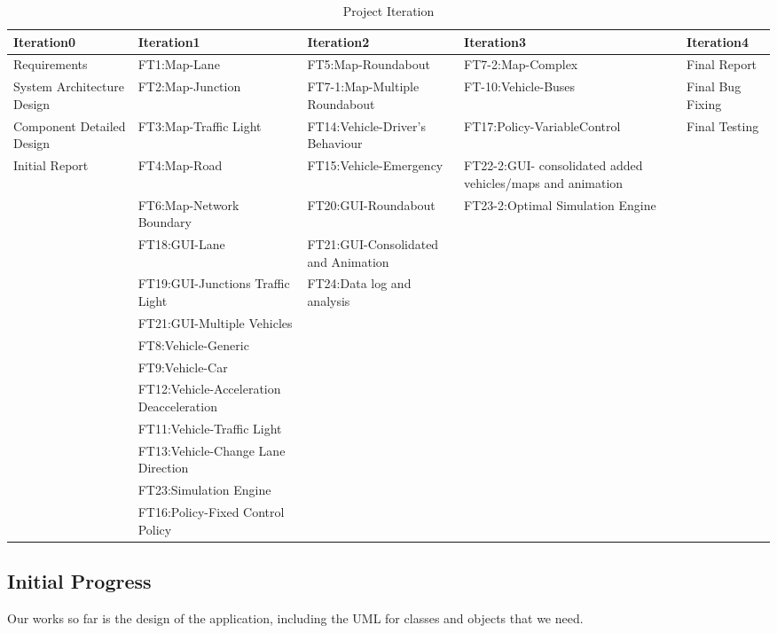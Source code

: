 \documentclass[11pt]{article}
\begin{document}
\begin{table}[H]
		\caption{Project Iteration}
		\centering
		\begin{tabular}{p{2.5cm}|p{4cm}|p{2.5cm}|p{2.5cm}|p{2cm}}
		\hline\hline
		Iteration0 & Iteration1 & Iteration2 & Iteration3 & Iteration4 \\ [0.5ex]
		\hline
		
		Requirements & FT1:Map-Lane & FT5:Map-Roundabout & FT7-2:Map-Complex & Final Report\\[1ex]
		
		System Architecture Design & FT2:Map-Junction & FT7-1:Map-Multiple Roundabout & FT-10:Vehicle-Buses & Final Bug Fixing\\ [1ex]
		
		Component Detailed Design & FT3:Map-Traffic Light & FT14:Vehicle-Driver's Behaviour & FT17:Policy-VariableControl & Final Testing\\ [1ex]
		
		Initial Report & FT4:Map-Road & FT15:Vehicle-Emergency & FT22-2:GUI- consolidated added vehicles/maps and animation \\[1ex]
		
		& FT6:Map-Network Boundary & FT20:GUI-Roundabout & FT23-2:Optimal Simulation Engine \\[1ex] 
		
		& FT18:GUI-Lane & FT21:GUI-Consolidated and Animation & \\[1ex]
		
		& FT19:GUI-Junctions Traffic Light & FT24:Data log and analysis & &\\[1ex]
		& FT21:GUI-Multiple Vehicles &&&\\
		& FT8:Vehicle-Generic &&& \\
		& FT9:Vehicle-Car &&& \\
		& FT12:Vehicle-Acceleration Deacceleration &&& \\
		& FT11:Vehicle-Traffic Light &&& \\
		& FT13:Vehicle-Change Lane Direction &&& \\
		& FT23:Simulation Engine &&& \\
		& FT16:Policy-Fixed Control Policy &&&\\
		
		
		
		\hline
		\end{tabular}
		\label{table:milestones} 
		\end{table}

	
\subsection{Initial Progress}
Our works so far is the design of the application, including the UML for classes and objects that we need. 
\end{document}
